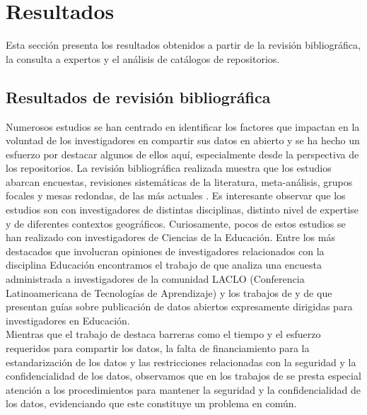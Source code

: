 \documentclass[runningheads]{llncs}
\begin{document}
\section{Resultados}

Esta sección presenta los resultados obtenidos a partir de la revisión bibliográfica, la consulta a expertos y el análisis de catálogos de repositorios.

\subsection{Resultados de revisión bibliográfica}

Numerosos estudios se han centrado en identificar los factores que impactan en la voluntad de los investigadores en compartir sus datos en abierto y se ha hecho un esfuerzo por destacar algunos de ellos aquí, especialmente desde la perspectiva de los repositorios. 
La revisión bibliográfica realizada muestra que los estudios abarcan encuestas, revisiones sistemáticas de la literatura, meta-análisis, grupos focales y mesas redondas, de las más actuales \citep{tenopir2011,revision2020,barczak2022,casali2022open, researchers2022,borycz2023,logan2021,researchers2024,malasya,bio-uy}. Es interesante observar que los estudios son con investigadores de distintas disciplinas, distinto nivel de expertise y de diferentes contextos geográficos. Curiosamente, pocos de estos estudios se han realizado con investigadores de Ciencias de la Educación. Entre los más destacados que involucran opiniones de investigadores relacionados con la disciplina Educación encontramos el trabajo de \citet{casali2022open} que analiza una encuesta administrada a investigadores de la comunidad LACLO (Conferencia Latinoamericana de Tecnologías de Aprendizaje) y los trabajos de \cite{logan2021} y de \cite{guia} 
que presentan guías sobre publicación de datos abiertos expresamente dirigidas para investigadores en Educación.\\

Mientras que el trabajo de \cite{casali2022open} destaca barreras como el tiempo y el esfuerzo requeridos para compartir los datos, la falta de financiamiento para la estandarización de los datos y las restricciones relacionadas con la seguridad y la confidencialidad de los datos, observamos que en los trabajos de \cite{logan2021, guia} se presta especial atención a los procedimientos para mantener la seguridad y la confidencialidad de los datos, evidenciando que este constituye un problema en común.\\
\end{document}
